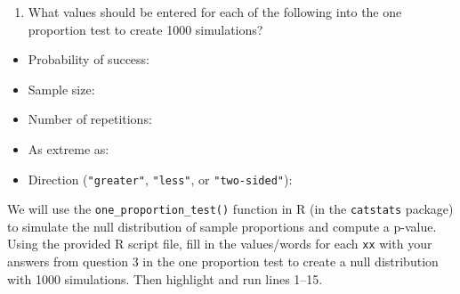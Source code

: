 \documentclass[
]{report}
\providecommand{\tightlist}{%
  \setlength{\itemsep}{0pt}\setlength{\parskip}{0pt}}
\begin{document}
\begin{enumerate}
\def\labelenumi{\arabic{enumi}.}
\setcounter{enumi}{2}
\tightlist
\item
  What values should be entered for each of the following into the one proportion test to create 1000 simulations?
\end{enumerate}

\vspace{1mm}

\begin{itemize}
\tightlist
\item
  Probability of success:
\end{itemize}

\vspace{.2in}

\begin{itemize}
\tightlist
\item
  Sample size:
\end{itemize}

\vspace{.2in}

\begin{itemize}
\tightlist
\item
  Number of repetitions:
\end{itemize}

\vspace{.2in}

\begin{itemize}
\tightlist
\item
  As extreme as:
\end{itemize}

\vspace{.2in}

\begin{itemize}
\tightlist
\item
  Direction (\texttt{"greater"}, \texttt{"less"}, or \texttt{"two-sided"}):
\end{itemize}

\newpage

We will use the \texttt{one\_proportion\_test()} function in R (in the \texttt{catstats} package) to simulate the null distribution of sample proportions and compute a p-value. Using the provided R script file, fill in the values/words for each \texttt{xx} with your answers from question 3 in the one proportion test to create a null distribution with 1000 simulations. Then highlight and run lines 1--15.
\end{document}
